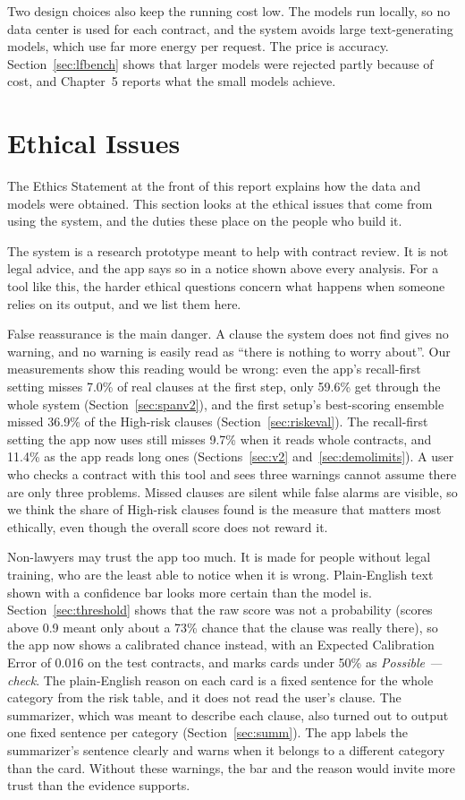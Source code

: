 Two design choices also keep the running cost low. The models run locally, so no data center is used for each contract, and the system avoids large text-generating models, which use far more energy per request. The price is accuracy. Section~\ref{sec:lfbench} shows that larger models were rejected partly because of cost, and Chapter~5 reports what the small models achieve.

\section{Ethical Issues}
\label{sec:ethics}
The Ethics Statement at the front of this report explains how the data and models were obtained. This section looks at the ethical issues that come from using the system, and the duties these place on the people who build it.

The system is a research prototype meant to help with contract review. It is not legal advice, and the app says so in a notice shown above every analysis. For a tool like this, the harder ethical questions concern what happens when someone relies on its output, and we list them here.

False reassurance is the main danger. A clause the system does not find gives no warning, and no warning is easily read as ``there is nothing to worry about''. Our measurements show this reading would be wrong: even the app's recall-first setting misses 7.0\% of real clauses at the first step, only 59.6\% get through the whole system (Section~\ref{sec:spanv2}), and the first setup's best-scoring ensemble missed 36.9\% of the High-risk clauses (Section~\ref{sec:riskeval}). The recall-first setting the app now uses still misses 9.7\% when it reads whole contracts, and 11.4\% as the app reads long ones (Sections~\ref{sec:v2} and~\ref{sec:demolimits}). A user who checks a contract with this tool and sees three warnings cannot assume there are only three problems. Missed clauses are silent while false alarms are visible, so we think the share of High-risk clauses found is the measure that matters most ethically, even though the overall score does not reward it.

Non-lawyers may trust the app too much. It is made for people without legal training, who are the least able to notice when it is wrong. Plain-English text shown with a confidence bar looks more certain than the model is. Section~\ref{sec:threshold} shows that the raw score was not a probability (scores above 0.9 meant only about a 73\% chance that the clause was really there), so the app now shows a calibrated chance instead, with an Expected Calibration Error of 0.016 on the test contracts, and marks cards under 50\% as \emph{Possible --- check}. The plain-English reason on each card is a fixed sentence for the whole category from the risk table, and it does not read the user's clause. The summarizer, which was meant to describe each clause, also turned out to output one fixed sentence per category (Section~\ref{sec:summ}). The app labels the summarizer's sentence clearly and warns when it belongs to a different category than the card. Without these warnings, the bar and the reason would invite more trust than the evidence supports.

